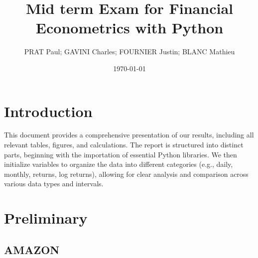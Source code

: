 \documentclass{article}
\begin{document}
\title{Mid term Exam for Financial Econometrics with Python}
\author{PRAT Paul; GAVINI Charles; FOURNIER Justin; BLANC Mathieu}
\date{\today}

\maketitle %

\tableofcontents %
\clearpage


\section{Introduction}


This document provides a comprehensive presentation of our results, 
including all relevant tables, figures, and calculations. 
The report is structured into distinct parts, beginning with the importation of essential Python libraries. 
We then initialize variables to organize the data into different categories (e.g., daily, monthly, returns, log returns), 
allowing for clear analysis and comparison across various data types and intervals.


\section{Preliminary}


\subsection{AMAZON}
\end{document}
